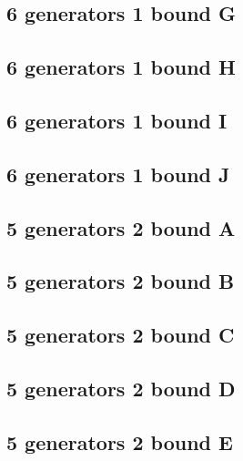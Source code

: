 \documentclass{TC}
\begin{document}
{\subsection{6 generators 1 bound G}

\newpage

\subsection{6 generators 1 bound H}

\newpage

\subsection{6 generators 1 bound I}


\newpage

\subsection{6 generators 1 bound J}

\newpage




\subsection{5 generators 2 bound A}

\newpage

\subsection{5 generators 2 bound B}

\newpage

\subsection{5 generators 2 bound C}

\newpage

\subsection{5 generators 2 bound D}

\newpage

\subsection{5 generators 2 bound E}
\label{fail2}

\newpage

}
\end{document}
